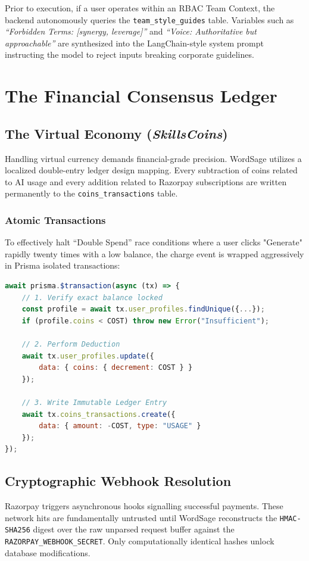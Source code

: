 \documentclass[12pt,a4paper]{report}
\begin{document}
Prior to execution, if a user operates within an RBAC Team Context, the backend autonomously queries the \texttt{team\_style\_guides} table. Variables such as \textit{``Forbidden Terms: [synergy, leverage]''} and \textit{``Voice: Authoritative but approachable''} are synthesized into the LangChain-style system prompt instructing the model to reject inputs breaking corporate guidelines.

\chapter{The Financial Consensus Ledger}

\section{The Virtual Economy (\textit{SkillsCoins})}
Handling virtual currency demands financial-grade precision. WordSage utilizes a localized double-entry ledger design mapping. Every subtraction of coins related to AI usage and every addition related to Razorpay subscriptions are written permanently to the \texttt{coins\_transactions} table.

\subsection{Atomic Transactions}
To effectively halt ``Double Spend'' race conditions where a user clicks "Generate" rapidly twenty times with a low balance, the charge event is wrapped aggressively in Prisma isolated transactions:

\begin{lstlisting}[language=JavaScript, caption=Atomic Ledger Insertion Strategy]
await prisma.$transaction(async (tx) => {
    // 1. Verify exact balance locked
    const profile = await tx.user_profiles.findUnique({...});
    if (profile.coins < COST) throw new Error("Insufficient");
    
    // 2. Perform Deduction
    await tx.user_profiles.update({ 
        data: { coins: { decrement: COST } } 
    });
    
    // 3. Write Immutable Ledger Entry
    await tx.coins_transactions.create({
        data: { amount: -COST, type: "USAGE" }
    });
});
\end{lstlisting}

\section{Cryptographic Webhook Resolution}
Razorpay triggers asynchronous hooks signalling successful payments. These network hits are fundamentally untrusted until WordSage reconstructs the \texttt{HMAC-SHA256} digest over the raw unparsed request buffer against the \texttt{RAZORPAY\_WEBHOOK\_SECRET}. Only computationally identical hashes unlock database modifications.
\end{document}
